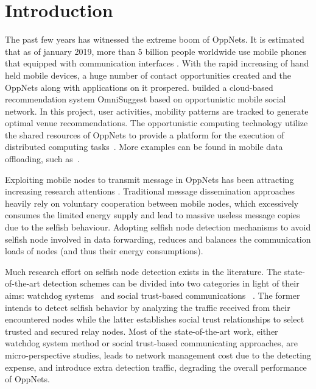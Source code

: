 \section{Introduction}
\label{sec:intro}
The past few years has witnessed
the extreme boom of OppNets. 
It is estimated that
as of january 2019, 
more than 5 billion people worldwide
use mobile phones
that equipped with communication interfaces 
\cite{GSMA19}.
With the rapid increasing of
hand held mobile devices,
a huge number of contact opportunities created
and the OppNets along with
applications on it prospered.
\cite{DBLP:journals/tsc/KhalidKKZ14} builded a
cloud-based recommendation system OmniSuggest 
based on opportunistic mobile social network.
In this project, user activities,
mobility patterns are tracked to
generate optimal venue recommendations.
The opportunistic computing technology utilize
the shared resources of OppNets to
provide a platform for the execution
of distributed computing tasks~\cite{DBLP:journals/tmc/ChatzopoulosAKH18}.
More examples can be found in mobile data offloading,
such as~\cite{DBLP:journals/tmc/HanHKMSS12,
DBLP:journals/tmc/LiQJHW014}.

Exploiting mobile nodes to transmit message in
OppNets has been attracting
increasing research attentions
\cite{DBLP:conf/sigcomm/SouzaMSMCC16,
DBLP:conf/mobicom/RadenkovicH17,
DBLP:journals/comsur/JedariXN18,
DBLP:journals/tmc/LoretiB20}.
Traditional message dissemination approaches
heavily rely on voluntary cooperation between
mobile nodes, which excessively consumes the
limited energy supply and lead to massive useless
message copies due to the selfish behaviour.
Adopting selfish node detection mechanisms
to avoid selfish node involved in data forwarding,
reduces and balances the communication loads
of nodes (and thus their energy consumptions).


Much research effort on selfish node detection
exists in the literature. The state-of-the-art
detection schemes can be divided into two categories
in light of their aims:
watchdog systems~\cite{DBLP:conf/mobicom/MartiGLB00,
DBLP:journals/tmc/Hernandez-Orallo15,
DBLP:journals/tie/DiasRXM15,
DBLP:journals/fgcs/JedariXCDTA19}
and social trust-based communications
~\cite{DBLP:journals/tpds/ZhuDGDC14,
DBLP:journals/tdsc/ChoC18,
DBLP:journals/tmc/ChoiSLW12}.
The former intends to detect selfish behavior
by analyzing the traffic received
from their encountered nodes
while the latter establishes social trust relationships
to select trusted and secured relay nodes.
Most of the state-of-the-art work,
either watchdog system method
or social trust-based communicating approaches,
are micro-perspective studies,
leads to network management cost 
due to the detecting expense,
and introduce extra detection traffic,
degrading the overall performance of OppNets.

